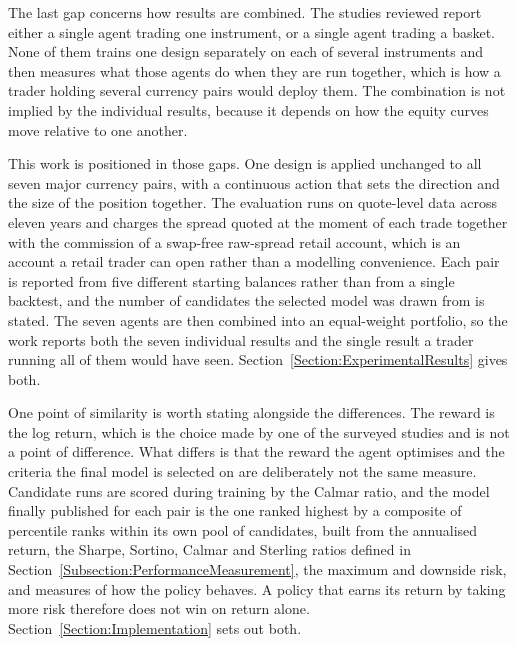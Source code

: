The last gap concerns how results are combined. The studies reviewed report either a single agent trading one instrument, or a single agent trading a basket. None of them trains one design separately on each of several instruments and then measures what those agents do when they are run together, which is how a trader holding several currency pairs would deploy them. The combination is not implied by the individual results, because it depends on how the equity curves move relative to one another.

This work is positioned in those gaps. One design is applied unchanged to all seven major currency pairs, with a continuous action that sets the direction and the size of the position together. The evaluation runs on quote-level data across eleven years and charges the spread quoted at the moment of each trade together with the commission of a swap-free raw-spread retail account, which is an account a retail trader can open rather than a modelling convenience. Each pair is reported from five different starting balances rather than from a single backtest, and the number of candidates the selected model was drawn from is stated. The seven agents are then combined into an equal-weight portfolio, so the work reports both the seven individual results and the single result a trader running all of them would have seen. Section~\ref{Section:ExperimentalResults} gives both.

One point of similarity is worth stating alongside the differences. The reward is the log return, which is the choice made by one of the surveyed studies \cite{majidi_algorithmic_2022} and is not a point of difference. What differs is that the reward the agent optimises and the criteria the final model is selected on are deliberately not the same measure. Candidate runs are scored during training by the Calmar ratio, and the model finally published for each pair is the one ranked highest by a composite of percentile ranks within its own pool of candidates, built from the annualised return, the Sharpe, Sortino, Calmar and Sterling ratios defined in Section~\ref{Subsection:PerformanceMeasurement}, the maximum and downside risk, and measures of how the policy behaves. A policy that earns its return by taking more risk therefore does not win on return alone. Section~\ref{Section:Implementation} sets out both.